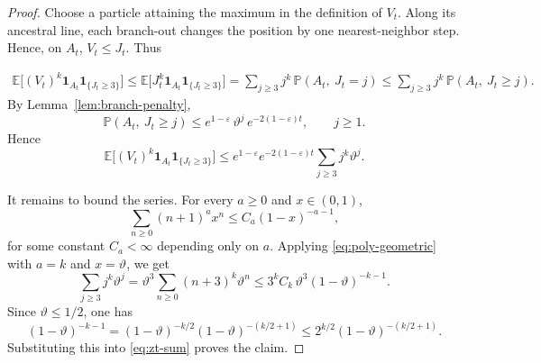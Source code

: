\documentclass[letterpaper,11pt,reqno]{amsart}
\theoremstyle{definition}
\begin{document}
\begin{proof}
Choose a particle attaining the maximum in the definition of \(V_t\). Along its ancestral line,
each branch-out changes the position by one nearest-neighbor step. Hence, on \(A_t\),
\(V_t\le J_t\).
Thus

\begin{align*}
\mathbb E\bigl[(V_t)^k\mathbf 1_{A_t}\mathbf 1_{\{J_t\ge3\}}\bigr]
\le
\mathbb E\bigl[J_t^k\mathbf 1_{A_t}\mathbf 1_{\{J_t\ge3\}}\bigr]
=
\sum_{j\ge3} j^k\,\mathbb P(A_t,\ J_t=j)
\le
\sum_{j\ge3} j^k\,\mathbb P(A_t,\ J_t\ge j).
\end{align*}
By Lemma~\ref{lem:branch-penalty},
\[
\mathbb P(A_t,\ J_t\ge j)\le e^{1-\varepsilon}\,\vartheta^j\,e^{-2(1-\varepsilon)t},
\qquad j\ge1.
\]
Hence
\begin{equation}\label{eq:zt-sum}
\mathbb E\bigl[(V_t)^k\mathbf 1_{A_t}\mathbf 1_{\{J_t\ge3\}}\bigr]
\le
e^{1-\varepsilon}e^{-2(1-\varepsilon)t}\sum_{j\ge3} j^k\vartheta^j.
\end{equation}

It remains to bound the series. For every \(a\ge0\) and \(x\in(0,1)\),
\begin{equation}\label{eq:poly-geometric}
\sum_{n\ge0}(n+1)^a x^n \le C_a(1-x)^{-a-1},
\end{equation}
for some constant \(C_a<\infty\) depending only on \(a\). Applying \eqref{eq:poly-geometric} with
\(a=k\) and \(x=\vartheta\), we get
\[
\sum_{j\ge3} j^k\vartheta^j
=
\vartheta^3\sum_{n\ge0}(n+3)^k\vartheta^n
\le
3^k C_k\,\vartheta^3(1-\vartheta)^{-k-1}.
\]
Since \(\vartheta\le1/2\), one has
\[
(1-\vartheta)^{-k-1}
=
(1-\vartheta)^{-k/2}(1-\vartheta)^{-(k/2+1)}
\le
2^{k/2}(1-\vartheta)^{-(k/2+1)}.
\]
Substituting this into \eqref{eq:zt-sum} proves the claim.
\end{proof}



\smallskip
\end{document}
